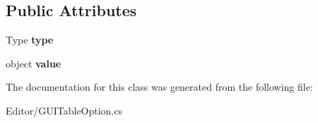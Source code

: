\subsection*{Public Attributes}
\begin{DoxyCompactItemize}
\item 
\mbox{\label{class_editor_g_u_i_table_1_1_g_u_i_table_option_aac0499445c98f69b27012f6348fb4fb3}} 
Type {\bfseries type}
\item 
\mbox{\label{class_editor_g_u_i_table_1_1_g_u_i_table_option_a0cfad34a241e2c7c777ba82a5eeb23e2}} 
object {\bfseries value}
\end{DoxyCompactItemize}


The documentation for this class was generated from the following file\+:\begin{DoxyCompactItemize}
\item 
Editor/G\+U\+I\+Table\+Option.\+cs\end{DoxyCompactItemize}
